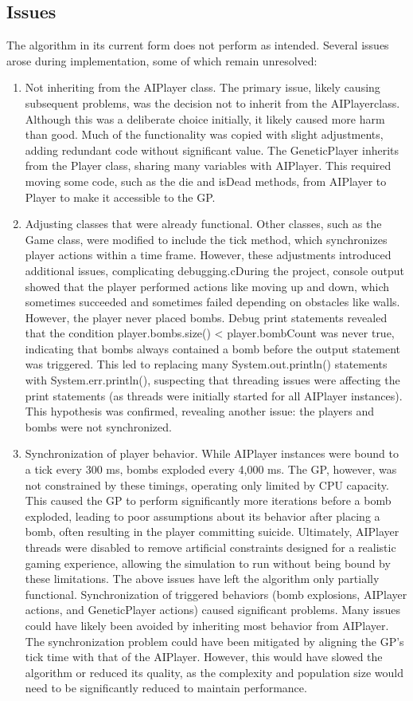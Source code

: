 \documentclass[sigconf]{acmart} %
\begin{document}
\subsection{Issues}
The algorithm in its current form does not perform as intended. Several issues arose during implementation, some of which remain unresolved: 
\begin{enumerate}
      \item Not inheriting from the AIPlayer class. 
      The primary issue, likely causing subsequent problems, was the decision not to inherit from the AIPlayerclass. Although this was a deliberate choice initially, it likely caused more harm than good. Much of the functionality was copied with slight adjustments, adding redundant code without significant value. The GeneticPlayer inherits from the Player class, sharing many variables with AIPlayer. This required moving some code, such as the die and isDead methods, from AIPlayer to Player to make it accessible to the GP.
      \item Adjusting classes that were already functional. 
      Other classes, such as the Game class, were modified to include the tick method, which synchronizes player actions within a time frame. However, these adjustments introduced additional issues, complicating debugging.cDuring the project, console output showed that the player performed actions like moving up and down, which sometimes succeeded and sometimes failed depending on obstacles like walls. However, the player never placed bombs. Debug print statements revealed that the condition player.bombs.size() < player.bombCount was never true, indicating that bombs always contained a bomb before the output statement was triggered. This led to replacing many System.out.println() statements with System.err.println(), suspecting that threading issues were affecting the print statements (as threads were initially started for all AIPlayer instances). This hypothesis was confirmed, revealing another issue: the players and bombs were not synchronized.
      \item Synchronization of player behavior. 
      While AIPlayer instances were bound to a tick every 300 ms, bombs exploded every 4,000 ms. The GP, however, was not constrained by these timings, operating only limited by CPU capacity. This caused the GP to perform significantly more iterations before a bomb exploded, leading to poor assumptions about its behavior after placing a bomb, often resulting in the player committing suicide. Ultimately, AIPlayer threads were disabled to remove artificial constraints designed for a realistic gaming experience, allowing the simulation to run without being bound by these limitations. The above issues have left the algorithm only partially functional. Synchronization of triggered behaviors (bomb explosions, AIPlayer actions, and GeneticPlayer actions) caused significant problems. Many issues could have likely been avoided by inheriting most behavior from AIPlayer. The synchronization problem could have been mitigated by aligning the GP's tick time with that of the AIPlayer. However, this would have slowed the algorithm or reduced its quality, as the complexity and population size would need to be significantly reduced to maintain performance. 

\end{enumerate}
\end{document}
